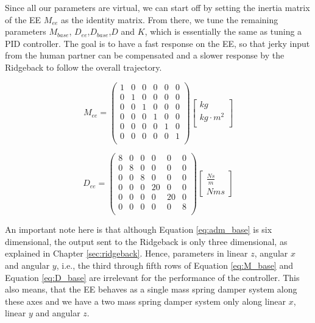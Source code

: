 Since all our parameters are virtual, we can start off by setting the inertia matrix of the EE $M_{ee}$ as the identity matrix. From there, we tune the remaining parameters $M_{base}$, $D_{ee}$,$D_{base}$,$D$ and $K$, which is essentially the same as tuning a PID controller. The goal is to have a fast response on the EE, so that jerky input from the human partner can be compensated and a slower response by the Ridgeback to follow the overall trajectory.

\begin{equation}
M_{ee} = \begin{pmatrix}
1 & 0 & 0 & 0 & 0 & 0 \\
0 & 1 & 0 & 0 & 0 & 0 \\
0 & 0 & 1 & 0 & 0 & 0 \\
0 & 0 & 0 & 1 & 0 & 0 \\
0 & 0 & 0 & 0 & 1 & 0 \\
0 & 0 & 0 & 0 & 0 & 1 \\
\end{pmatrix}
\begin{bmatrix}
kg \\
kg \cdot m^2 \\
\end{bmatrix}
\end{equation}

\begin{equation}
D_{ee} = \begin{pmatrix}
8 & 0 & 0 & 0 & 0 & 0 \\
0 & 8 & 0 & 0 & 0 & 0 \\
0 & 0 & 8 & 0 & 0 & 0 \\
0 & 0 & 0 & 20 & 0 & 0 \\
0 & 0 & 0 & 0 & 20 & 0 \\
0 & 0 & 0 & 0 & 0 & 8 \\
\end{pmatrix}
\begin{bmatrix}
\frac{N s}{m} \\
N m s
\end{bmatrix}
\end{equation}

An important note here is that although Equation \ref{eq:adm_base} is six dimensional, the output sent to the Ridgeback is only three dimensional, as explained in Chapter \ref{sec:ridgeback}. Hence, parameters in linear $z$, angular $x$ and angular $y$, i.e., the third through fifth rows of Equation \ref{eq:M_base} and Equation \ref{eq:D_base} are irrelevant for the performance of the controller. This also means, that the EE behaves as a single mass spring damper system along these axes and we have a two mass spring damper system only along linear $x$, linear $y$ and angular $z$.

